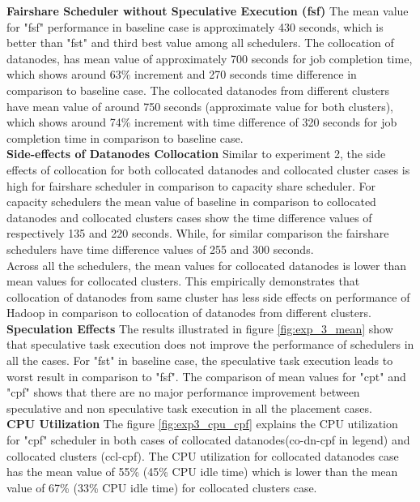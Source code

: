 \textbf{Fairshare Scheduler without Speculative Execution (fsf) } The  mean value for "fsf" performance  in baseline case is approximately 430 seconds, which is better than "fst" and third best value among all schedulers. The collocation of datanodes, has mean value of approximately 700 seconds for job completion time, which shows around 63\% increment and 270 seconds time difference in comparison to baseline case. The collocated datanodes from different clusters have mean value of around 750 seconds (approximate value for both clusters), which shows around 74\% increment with time difference of 320 seconds for job completion time in comparison to baseline case. \\
 ‌  
\textbf{Side-effects of Datanodes Collocation } Similar to experiment 2, the side effects of collocation for both collocated datanodes and collocated cluster cases is high for fairshare scheduler in comparison to capacity share scheduler. For capacity schedulers the mean value of baseline in comparison to collocated datanodes and collocated clusters cases show the  time difference values of respectively 135 and 220 seconds. While, for similar comparison the fairshare schedulers have time difference values of 255 and 300 seconds. \\    

Across all the schedulers, the mean values for collocated datanodes is lower than mean values for collocated clusters. This empirically demonstrates that collocation of datanodes from same cluster has less side effects on performance of Hadoop in comparison to collocation of datanodes from different clusters.\\  



\textbf{Speculation Effects }  The results illustrated in figure \ref{fig:exp_3_mean} show that  speculative task execution does not improve the performance of schedulers in all the cases. For "fst" in baseline case, the speculative task execution leads to worst result in comparison to "fsf". The comparison of mean values for "cpt" and "cpf" shows that there are no major performance improvement between speculative and non speculative task execution in all the placement cases. \\ 

\textbf{CPU Utilization} The figure \ref{fig:exp3_cpu_cpf} explains the CPU utilization for "cpf" scheduler in both cases of collocated datanodes(co-dn-cpf in legend) and collocated clusters (ccl-cpf). The CPU utilization for collocated datanodes case has the mean value of 55\% (45\% CPU idle time) which is lower than the mean value of 67\% (33\% CPU idle time) for collocated clusters case. \\
 
